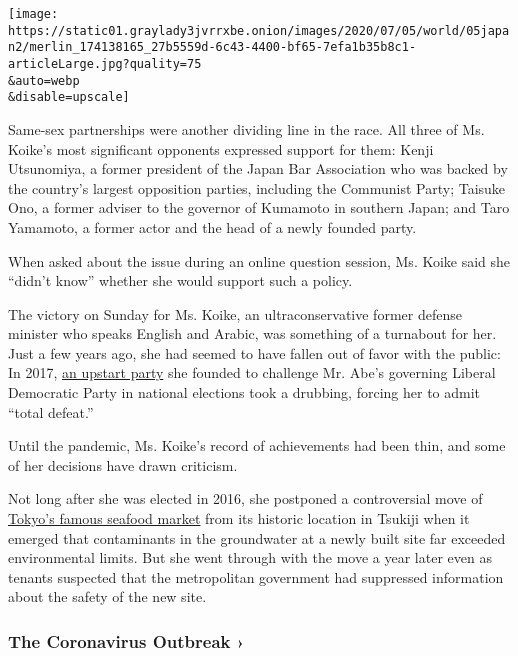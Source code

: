 \texttt{[image: https://static01.graylady3jvrrxbe.onion/images/2020/07/05/world/05japan2/merlin\_174138165\_27b5559d-6c43-4400-bf65-7efa1b35b8c1-articleLarge.jpg?quality=75\\\&auto=webp\\\&disable=upscale]}

Same-sex partnerships were another dividing line in the race. All three
of Ms. Koike's most significant opponents expressed support for them:
Kenji Utsunomiya, a former president of the Japan Bar Association who
was backed by the country's largest opposition parties, including the
Communist Party; Taisuke Ono, a former adviser to the governor of
Kumamoto in southern Japan; and Taro Yamamoto, a former actor and the
head of a newly founded party.

When asked about the issue during an online question session, Ms. Koike
said she ``didn't know'' whether she would support such a policy.

The victory on Sunday for Ms. Koike, an ultraconservative former defense
minister who speaks English and Arabic, was something of a turnabout for
her. Just a few years ago, she had seemed to have fallen out of favor
with the public: In 2017,
\href{https://www.nytimes3xbfgragh.onion/2017/09/25/world/asia/japan-abe-election.html}{an
upstart party} she founded to challenge Mr. Abe's governing Liberal
Democratic Party in national elections took a drubbing, forcing her to
admit ``total defeat.''

Until the pandemic, Ms. Koike's record of achievements had been thin,
and some of her decisions have drawn criticism.

Not long after she was elected in 2016, she postponed a controversial
move of
\href{https://www.nytimes3xbfgragh.onion/2018/10/06/world/asia/tokyo-fish-market-tsukiji.html}{Tokyo's
famous seafood market} from its historic location in Tsukiji when it
emerged that contaminants in the groundwater at a newly built site far
exceeded environmental limits. But she went through with the move a year
later even as tenants suspected that the metropolitan government had
suppressed information about the safety of the new site.

\href{https://www.nytimes3xbfgragh.onion/news-event/coronavirus?action=click\&pgtype=Article\&state=default\&region=MAIN_CONTENT_3\&context=storylines_faq}{}

\hypertarget{the-coronavirus-outbreak-}{%
\subsubsection{The Coronavirus Outbreak
›}\label{the-coronavirus-outbreak-}}

